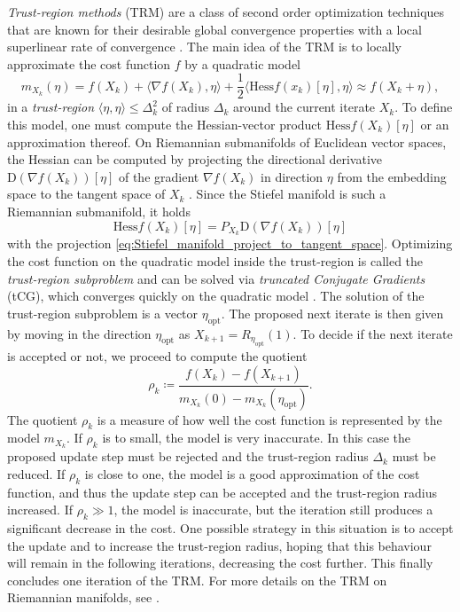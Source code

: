 \textit{Trust-region methods} (TRM) are a class of second order optimization techniques that are known for their desirable global convergence properties with a local superlinear rate of convergence \cite{cite:optimization_on_matrix_manifolds, cite:trust_region_methods_on_riemannian_manifolds}. The main idea of the TRM is to locally approximate the cost function $f$ by a quadratic model
\begin{equation}
	m_{X_k}(\eta) = f(X_k) + \langle \nabla f(X_k), \eta\rangle + \frac{1}{2}\langle \text{Hess}f(x_k)[\eta], \eta\rangle \approx f(X_k+\eta),
\end{equation}
in a \textit{trust-region} $\langle\eta,\eta\rangle \le \Delta_k^2$ of radius $\Delta_k$ around the current iterate $X_k$. To define this model, one must compute the Hessian-vector product $\text{Hess}f(X_k)[\eta]$ or an approximation thereof. On Riemannian submanifolds of Euclidean vector spaces, the Hessian can be computed by projecting the directional derivative $\text{D}(\nabla f(X_k))\left[\eta\right]$ of the gradient $\nabla f(X_k)$ in direction $\eta$ from the embedding space to the tangent space of $X_k$ \cite{cite:optimization_on_matrix_manifolds}. Since the Stiefel manifold is such a Riemannian submanifold, it holds
\begin{equation}
	\label{eq:hessian_vector_product}
	\text{Hess}f(X_k)[\eta] = P_{X_k} \text{D}(\nabla f(X_k))\left[\eta\right]
\end{equation}
with the projection \eqref{eq:Stiefel_manifold_project_to_tangent_space}. Optimizing the cost function on the quadratic model inside the trust-region is called the \textit{trust-region subproblem} and can be solved via \textit{truncated Conjugate Gradients} (tCG), which converges quickly on the quadratic model \cite{cite:optimization_on_matrix_manifolds}. The solution of the trust-region subproblem is a vector $\eta_\text{opt}$. The proposed next iterate is then given by moving in the direction $\eta_\text{opt}$ as $X_{k+1} = R_{\eta_\text{opt}}(1)$. To decide if the next iterate is accepted or not, we proceed to compute the quotient
\begin{equation}
	\rho_k \coloneqq \frac{f(X_k) - f(X_{k+1})}{m_{X_k}(0) - m_{X_k}(\eta_\text{opt})}.
\end{equation}
The quotient $\rho_k$ is a measure of how well the cost function is represented by the model $m_{X_k}$. If $\rho_k$ is to small, the model is very inaccurate. In this case the proposed update step must be rejected and the trust-region radius $\Delta_k$ must be reduced. If $\rho_k$ is close to one, the model is a good approximation of the cost function, and thus the update step can be accepted and the trust-region radius increased. If $\rho_k \gg 1$, the model is inaccurate, but the iteration still produces a significant decrease in the cost. One possible strategy in this situation is to accept the update and to increase the trust-region radius, hoping that this behaviour will remain in the following iterations, decreasing the cost further. This finally concludes one iteration of the TRM. For more details on the TRM on Riemannian manifolds, see \cite{cite:optimization_on_matrix_manifolds, cite:trust_region_methods_on_riemannian_manifolds, cite:pymanopt}.